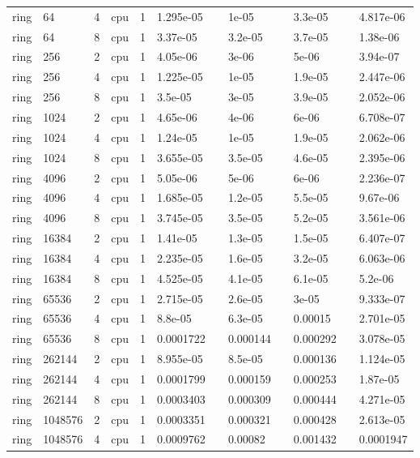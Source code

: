 \begin{tabular}{llllllllllll}
ring & 64 & 4 & cpu & 1 & 1.295e-05 &  & 1e-05 &  & 3.3e-05 &  & 4.817e-06 \\
ring & 64 & 8 & cpu & 1 & 3.37e-05 &  & 3.2e-05 &  & 3.7e-05 &  & 1.38e-06 \\
ring & 256 & 2 & cpu & 1 & 4.05e-06 &  & 3e-06 &  & 5e-06 &  & 3.94e-07 \\
ring & 256 & 4 & cpu & 1 & 1.225e-05 &  & 1e-05 &  & 1.9e-05 &  & 2.447e-06 \\
ring & 256 & 8 & cpu & 1 & 3.5e-05 &  & 3e-05 &  & 3.9e-05 &  & 2.052e-06 \\
ring & 1024 & 2 & cpu & 1 & 4.65e-06 &  & 4e-06 &  & 6e-06 &  & 6.708e-07 \\
ring & 1024 & 4 & cpu & 1 & 1.24e-05 &  & 1e-05 &  & 1.9e-05 &  & 2.062e-06 \\
ring & 1024 & 8 & cpu & 1 & 3.655e-05 &  & 3.5e-05 &  & 4.6e-05 &  & 2.395e-06 \\
ring & 4096 & 2 & cpu & 1 & 5.05e-06 &  & 5e-06 &  & 6e-06 &  & 2.236e-07 \\
ring & 4096 & 4 & cpu & 1 & 1.685e-05 &  & 1.2e-05 &  & 5.5e-05 &  & 9.67e-06 \\
ring & 4096 & 8 & cpu & 1 & 3.745e-05 &  & 3.5e-05 &  & 5.2e-05 &  & 3.561e-06 \\
ring & 16384 & 2 & cpu & 1 & 1.41e-05 &  & 1.3e-05 &  & 1.5e-05 &  & 6.407e-07 \\
ring & 16384 & 4 & cpu & 1 & 2.235e-05 &  & 1.6e-05 &  & 3.2e-05 &  & 6.063e-06 \\
ring & 16384 & 8 & cpu & 1 & 4.525e-05 &  & 4.1e-05 &  & 6.1e-05 &  & 5.2e-06 \\
ring & 65536 & 2 & cpu & 1 & 2.715e-05 &  & 2.6e-05 &  & 3e-05 &  & 9.333e-07 \\
ring & 65536 & 4 & cpu & 1 & 8.8e-05 &  & 6.3e-05 &  & 0.00015 &  & 2.701e-05 \\
ring & 65536 & 8 & cpu & 1 & 0.0001722 &  & 0.000144 &  & 0.000292 &  & 3.078e-05 \\
ring & 262144 & 2 & cpu & 1 & 8.955e-05 &  & 8.5e-05 &  & 0.000136 &  & 1.124e-05 \\
ring & 262144 & 4 & cpu & 1 & 0.0001799 &  & 0.000159 &  & 0.000253 &  & 1.87e-05 \\
ring & 262144 & 8 & cpu & 1 & 0.0003403 &  & 0.000309 &  & 0.000444 &  & 4.271e-05 \\
ring & 1048576 & 2 & cpu & 1 & 0.0003351 &  & 0.000321 &  & 0.000428 &  & 2.613e-05 \\
ring & 1048576 & 4 & cpu & 1 & 0.0009762 &  & 0.00082 &  & 0.001432 &  & 0.0001947 \\

\end{tabular}
